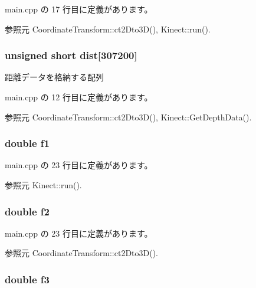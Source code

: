  main.\-cpp の 17 行目に定義があります。



参照元 Coordinate\-Transform\-::ct2\-Dto3\-D(), Kinect\-::run().

\subsubsection[{dist}]{\setlength{\rightskip}{0pt plus 5cm}unsigned short dist[307200]}\label{main_8cpp_afcfa9131bcff2392e4916bec3f2c78d1}


距離データを格納する配列 



 main.\-cpp の 12 行目に定義があります。



参照元 Coordinate\-Transform\-::ct2\-Dto3\-D(), Kinect\-::\-Get\-Depth\-Data().

\subsubsection[{f1}]{\setlength{\rightskip}{0pt plus 5cm}double f1}\label{main_8cpp_a11d54e4d4a8a4dfc36e4b5c8576a6079}


 main.\-cpp の 23 行目に定義があります。



参照元 Kinect\-::run().

\subsubsection[{f2}]{\setlength{\rightskip}{0pt plus 5cm}double f2}\label{main_8cpp_ac287bf324063285e92e9f3b9dfb8f408}


 main.\-cpp の 23 行目に定義があります。



参照元 Coordinate\-Transform\-::ct2\-Dto3\-D().

\subsubsection[{f3}]{\setlength{\rightskip}{0pt plus 5cm}double f3}\label{main_8cpp_a1d4774d4b1fa6156af69befbb5a9f079}


